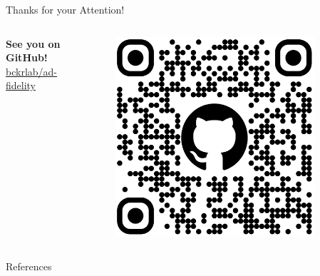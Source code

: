 \documentclass[aspectratio=169,xcolor={table, dvipsnames}]{beamer}
\renewcommand{\emph}[1]{\textbf{#1}}
\begin{document}
\begin{frame}{Thanks for your Attention!}
	\begin{columns}
		\begin{column}{0.5\textwidth}
			\huge
			\emph{See you on GitHub!}
			\href{https://github.com/bckrlab/ad-fidelity}{bckrlab/ad-fidelity}
		\end{column}\hfill
		\begin{column}{0.5\textwidth}
			\begin{figure}
				\href{https://github.com/bckrlab/ad-fidelity}{\includegraphics[width=0.9\textwidth]{figures/github-qr.png}}
			\end{figure}
		\end{column}
	\end{columns}
\end{frame}

\begin{frame}[allowframebreaks]{References}
	\tiny
	\printbibliography[heading=none]
\end{frame}
\end{document}
